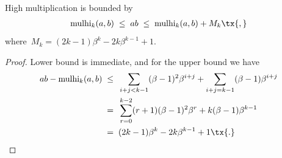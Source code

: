 \documentclass[12pt,oneside,draft]{scrartcl}
\begin{document}
\begin{proposition}
\label{prop:mulhi_bound}
High multiplication is bounded by
\begin{gather}
  \mulhi_{k}(a, b)
\;\le\;
  a b
\;\le\;
  \mulhi_{k}(a, b) + M_{k}
\tx{,}
\end{gather}
where~$M_{k} = (2 k - 1) \beta^{k} - 2 k \beta^{k - 1} + 1$.
\end{proposition}
\begin{proof}
Lower bound is immediate, and for the upper bound we have
\begin{align*}
  a b - \mulhi_{k}(a, b)
\;\le{}&\;
  \sum_{i + j < k - 1} (\beta - 1)^{2} \beta^{i + j}
  +
  \sum_{i + j = k - 1} (\beta - 1) \beta^{i + j}
\\
={}&\;
  \sum_{r = 0}^{k - 2} (r + 1) (\beta - 1)^{2} \beta^{r}
  +
  k (\beta - 1) \beta^{k - 1}
\\
={}&\;
  (2 k - 1) \beta^{k} - 2 k \beta^{k - 1} + 1
\tx{.}
\end{align*}
\end{proof}

\end{document}
